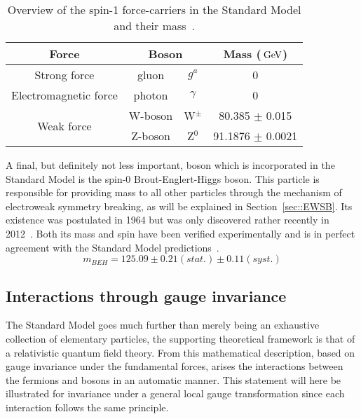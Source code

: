 \begin{table}[h!t]
 \centering
 \caption{Overview of the spin-1 force-carriers in the Standard Model and their mass~\cite{PDGReview}.} \label{table::ForceCarriers}
 \begin{tabular}{|c|cc|c|}%
  \hline
  \textbf{Force} 		&\multicolumn{2}{c|}{\textbf{Boson}} 	& \textbf{Mass ($\, \mathrm{GeV}$)}	\\ %
  \hline
  Strong force 			& gluon 	& $g^{a}$		& 0 				\\ %
  \hline
  Electromagnetic force		& photon 	& $\gamma$ 		& 0 				\\ %
  \hline
  \multirow{2}{*}{Weak force} 	& W-boson 	& W$^{\pm}$ 		& 80.385 $\pm$ 0.015		\\ %
				& Z-boson 	& Z$^{0}$ 		& 91.1876 $\pm$ 0.0021		\\ %
  \hline
 \end{tabular}
\end{table}

A final, but definitely not less important, boson which is incorporated in the Standard Model is the spin-0 Brout-Englert-Higgs boson. This particle is responsible for providing mass to all other particles through the mechanism of electroweak symmetry breaking, as will be explained in Section~\ref{sec::EWSB}. Its existence was postulated in 1964 but was only discovered rather recently in 2012~\cite{HiggsDiscCMS, HiggsDiscAtlas}. Both its mass and spin have been verified experimentally and is in perfect agreement with the Standard Model predictions~\cite{HiggsMass, HiggsSpin}.
\begin{equation}
 m_{BEH} = 125.09 \pm 0.21 (stat.) \pm 0.11 (syst.)
\end{equation}

\subsection{Interactions through gauge invariance}
The Standard Model goes much further than merely being an exhaustive collection of elementary particles, the supporting theoretical framework is that of a relativistic quantum field theory.
From this mathematical description, based on gauge invariance under the fundamental forces, arises the interactions between the fermions and bosons in an automatic manner.
This statement will here be illustrated for invariance under a general local gauge transformation since each interaction follows the same principle.
\\

